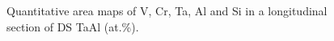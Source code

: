 \begin{landscape}
\begin{figure}[htbp]
\begin{center}
\caption{Quantitative area maps of V, Cr, Ta, Al and Si in a longitudinal section of DS TaAl (at.\%).}
\label{fig:area_map_sanTaAli_At}
\end{center}
\end{figure}
\end{landscape}
%

